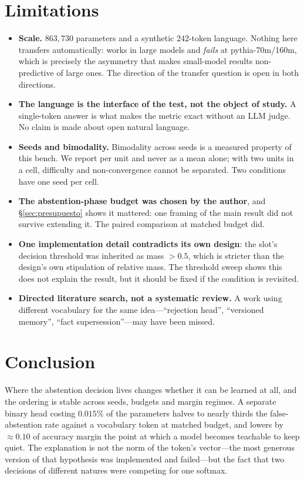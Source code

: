 \documentclass[11pt,a4paper]{article}
\begin{document}
\section{Limitations}
\label{sec:limits}

\begin{itemize}
\item \textbf{Scale.} $863{,}730$ parameters and a synthetic $242$-token language. Nothing here
transfers automatically: \citet{cohen2024idk} works in large models and \emph{fails} at
pythia-70m/160m, which is precisely the asymmetry that makes small-model results non-predictive of
large ones. The direction of the transfer question is open in both directions.
\item \textbf{The language is the interface of the test, not the object of study.} A single-token
answer is what makes the metric exact without an LLM judge. No claim is made about open natural
language.
\item \textbf{Seeds and bimodality.} Bimodality across seeds is a measured property of this bench.
We report per unit and never as a mean alone; with two units in a cell, difficulty and
non-convergence cannot be separated. Two conditions have one seed per cell.
\item \textbf{The abstention-phase budget was chosen by the author}, and \S\ref{sec:presupuesto}
shows it mattered: one framing of the main result did not survive extending it. The paired
comparison at matched budget did.
\item \textbf{One implementation detail contradicts its own design}: the slot's decision threshold
was inherited as mass $> 0.5$, which is stricter than the design's own stipulation of relative mass.
The threshold sweep shows this does not explain the result, but it should be fixed if the condition
is revisited.
\item \textbf{Directed literature search, not a systematic review.} A work using different
vocabulary for the same idea---``rejection head'', ``versioned memory'', ``fact supersession''---may
have been missed.
\end{itemize}

\section{Conclusion}

Where the abstention decision lives changes whether it can be learned at all, and the ordering is
stable across seeds, budgets and margin regimes. A separate binary head costing $0.015\%$ of the
parameters halves to nearly thirds the false-abstention rate against a vocabulary token at matched
budget, and lowers by $\approx 0.10$ of accuracy margin the point at which a model becomes teachable
to keep quiet. The explanation is not the norm of the token's vector---the most generous version of
that hypothesis was implemented and failed---but the fact that two decisions of different natures
were competing for one softmax.
\end{document}
